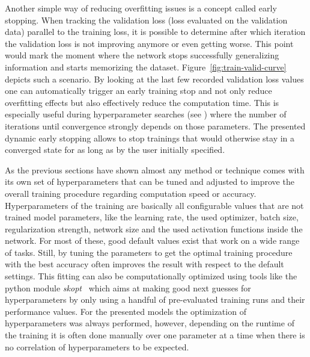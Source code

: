 \label{sssec:earlystop}

Another simple way of reducing overfitting issues is a concept called early stopping. When tracking the validation loss (loss evaluated on the validation data) parallel to the training loss, it is possible to determine after which iteration the validation loss is not improving anymore or even getting worse. This point would mark the moment where the network stops successfully generalizing information and starts memorizing the dataset. Figure~\ref{fig:train-valid-curve} depicts such a scenario. By looking at the last few recorded validation loss values one can automatically trigger an early training stop and not only reduce overfitting effects but also effectively reduce the computation time. This is especially useful during hyperparameter searches (see ) where the number of iterations until convergence strongly depends on those parameters. The presented dynamic early stopping allows to stop trainings that would otherwise stay in a converged state for as long as by the user initially specified.

\label{sssec:hyper}

As the previous sections have shown almost any method or technique comes with its own set of hyperparameters that can be tuned and adjusted to improve the overall training procedure regarding computation speed or accuracy. Hyperparameters of the training are basically all configurable values that are not trained model parameters, like the learning rate, the used optimizer, batch size, regularization strength, network size and the used activation functions inside the network. For most of these, good default values exist that work on a wide range of tasks. Still, by tuning the parameters to get the optimal training procedure with the best accuracy often improves the result with respect to the default settings. This fitting can also be computationally optimized using tools like the python module \emph{skopt}~\cite{skopt} which aims at making good next guesses for hyperparameters by only using a handful of pre-evaluated training runs and their performance values. For the presented models the optimization of hyperparameters was always performed, however, depending on the runtime of the training it is often done manually over one parameter at a time when there is no correlation of hyperparameters to be expected.


